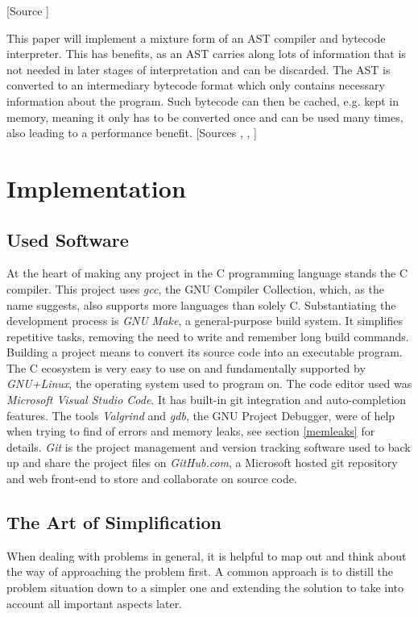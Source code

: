 \documentclass[12pt,a4paper]{article}
\begin{document}
[Source ]

This paper will implement a mixture form of an AST compiler and bytecode
interpreter. This has benefits, as an AST carries along lots of information
that is not needed in later stages of interpretation and can be discarded.
The AST is converted to an intermediary bytecode format which only contains
necessary information about the program. Such bytecode can then be cached,
e.g. kept in memory, meaning it only has to be converted once and can be
used many times, also leading to a performance benefit.
[Sources , , ]

\section{Implementation}
\subsection{Used Software}
At the heart of making any project in the C programming language
stands the C compiler. This project uses
\emph{gcc}, the GNU Compiler Collection, which, as the name suggests, also 
supports more languages than solely C. Substantiating the development process is 
\emph{GNU Make}, a general-purpose build system. It simplifies repetitive tasks,
removing the need to write and remember long build commands. Building a project
means to convert its source code into an executable program.
The C ecosystem is very easy to use on and fundamentally supported by 
\emph{GNU+Linux}, the operating system used to program on.
The code editor used was \emph{Microsoft Visual Studio Code}.
It has built-in git integration and auto-completion features.
The tools \emph{Valgrind} and \emph{gdb}, the GNU Project Debugger, were of help
when trying to find of errors and memory leaks, see section \ref{memleaks} for details.
\emph{Git} is the project management and version tracking software used to back up and share
the project files on \emph{GitHub.com}, a Microsoft hosted git repository and
web front-end to store and collaborate on source code.

\subsection{The Art of Simplification}
When dealing with problems in general, it is helpful to map out and think about
the way of approaching the problem first. A common approach is to distill the
problem situation down to a simpler one and extending the solution to take into
account all important aspects later.
\end{document}
